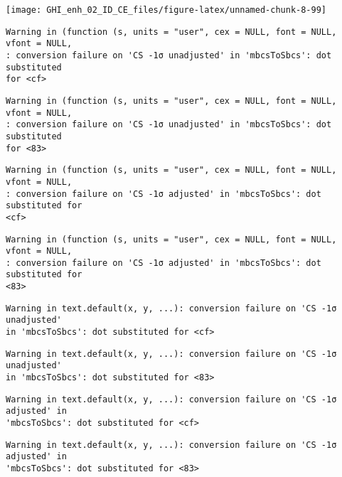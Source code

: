 \documentclass[
  10pt,
  a4paper,oneside]{article}
\begin{document}
\begin{center}\texttt{[image: GHI\_enh\_02\_ID\_CE\_files/figure-latex/unnamed-chunk-8-99]} \end{center}

\begin{verbatim}
Warning in (function (s, units = "user", cex = NULL, font = NULL, vfont = NULL,
: conversion failure on 'CS -1σ unadjusted' in 'mbcsToSbcs': dot substituted
for <cf>
\end{verbatim}

\begin{verbatim}
Warning in (function (s, units = "user", cex = NULL, font = NULL, vfont = NULL,
: conversion failure on 'CS -1σ unadjusted' in 'mbcsToSbcs': dot substituted
for <83>
\end{verbatim}

\begin{verbatim}
Warning in (function (s, units = "user", cex = NULL, font = NULL, vfont = NULL,
: conversion failure on 'CS -1σ adjusted' in 'mbcsToSbcs': dot substituted for
<cf>
\end{verbatim}

\begin{verbatim}
Warning in (function (s, units = "user", cex = NULL, font = NULL, vfont = NULL,
: conversion failure on 'CS -1σ adjusted' in 'mbcsToSbcs': dot substituted for
<83>
\end{verbatim}

\begin{verbatim}
Warning in text.default(x, y, ...): conversion failure on 'CS -1σ unadjusted'
in 'mbcsToSbcs': dot substituted for <cf>
\end{verbatim}

\begin{verbatim}
Warning in text.default(x, y, ...): conversion failure on 'CS -1σ unadjusted'
in 'mbcsToSbcs': dot substituted for <83>
\end{verbatim}

\begin{verbatim}
Warning in text.default(x, y, ...): conversion failure on 'CS -1σ adjusted' in
'mbcsToSbcs': dot substituted for <cf>
\end{verbatim}

\begin{verbatim}
Warning in text.default(x, y, ...): conversion failure on 'CS -1σ adjusted' in
'mbcsToSbcs': dot substituted for <83>
\end{verbatim}
\end{document}
